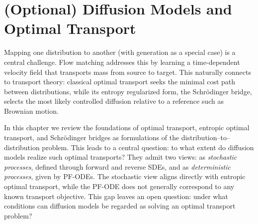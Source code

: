 \chapter{(Optional) Diffusion Models and Optimal Transport}\label{ch:ot-eot}



Mapping one distribution to another (with generation as a special case) 
is a central challenge. Flow matching addresses this by learning a 
time-dependent velocity field that transports mass from source to target. 
This naturally connects to transport theory: classical optimal transport 
seeks the minimal cost path between distributions, while its entropy 
regularized form, the Schr\"odinger bridge, selects the most likely 
controlled diffusion relative to a reference such as Brownian motion. 

In this chapter we review the foundations of optimal transport, entropic 
optimal transport, and Schr\"odinger bridges as formulations of the 
distribution–to–distribution problem. This leads to a central question: 
to what extent do diffusion models realize such optimal transports? 
They admit two views: as \emph{stochastic processes}, defined through 
forward and reverse SDEs, and as \emph{deterministic processes}, given 
by PF-ODEs. The stochastic view aligns directly with 
entropic optimal transport, while the PF-ODE does not 
generally correspond to any known transport objective. This gap leaves 
an open question: under what conditions can diffusion models be regarded 
as solving an optimal transport problem?



